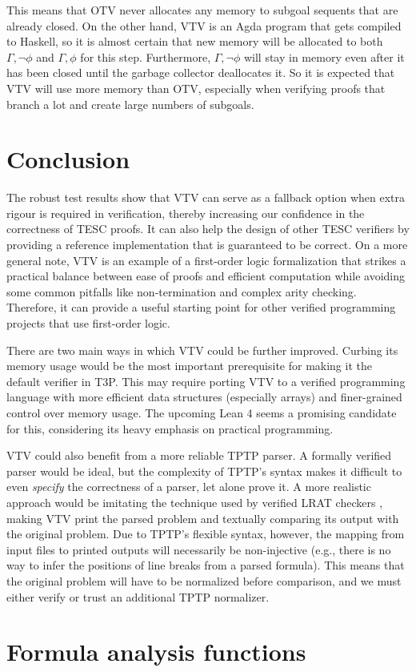 \documentclass{lipics-v2021}
\begin{document}
This means that OTV never allocates any memory to subgoal sequents that are 
already closed. On the other hand, VTV is an Agda program that gets compiled 
to Haskell, so it is almost certain that new memory will be allocated to both
$\Gamma, \lnot \phi$ and $\Gamma, \phi$ for this step. Furthermore, 
$\Gamma, \lnot \phi$ will stay in memory even after it has been closed until 
the garbage collector deallocates it. So it is expected that VTV will use 
more memory than OTV, especially when verifying proofs that branch a lot and 
create large numbers of subgoals.

\section{Conclusion}  \label{sec:conclusion}

The robust test results show that VTV can serve as a fallback option when extra rigour 
is required in verification, thereby increasing our confidence in the correctness of TESC proofs. 
It can also help the design of other TESC verifiers by providing a reference implementation 
that is guaranteed to be correct. On a more general note, VTV is an example of a first-order logic 
formalization that strikes a practical balance between ease of proofs and efficient computation 
while avoiding some common pitfalls like non-termination and complex arity checking. 
Therefore, it can provide a useful starting point for other verified programming projects 
that use first-order logic.

There are two main ways in which VTV could be further improved. Curbing its 
memory usage would be the most important prerequisite for making it the 
default verifier in T3P. This may require porting VTV to a verified programming
language with more efficient data structures (especially arrays) and finer-grained 
control over memory usage. The upcoming Lean 4 seems a promising candidate for this,
considering its heavy emphasis on practical programming.

VTV could also benefit from a more reliable TPTP parser. A formally verified 
parser would be ideal, but the complexity of TPTP's syntax makes it difficult  
to even \textit{specify} the correctness of a parser, let alone prove it. 
A more realistic approach would be imitating the technique used by verified 
LRAT checkers \cite{heule2017efficient}, making VTV print the parsed problem 
and textually comparing its output with the original problem. Due to TPTP's 
flexible syntax, however, the mapping from input files to printed outputs 
will necessarily be non-injective (e.g., there is no way to infer the positions 
of line breaks from a parsed formula). This means that the original problem will 
have to be normalized before comparison, and we must either verify or trust an 
additional TPTP normalizer.



\appendix  

\section{Formula analysis functions} \label{apdx:faf}


\end{document}
